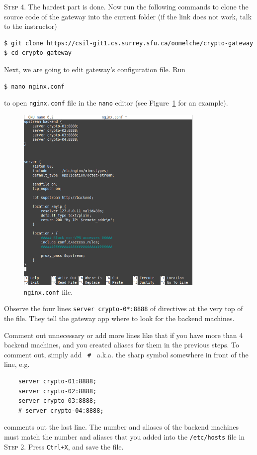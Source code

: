 \documentclass{article}
\begin{document}
\textsc{Step 4}. The hardest part is done. Now run the following commands to clone the source code of the gateway into the current folder (if the link does not work, talk to the instructor)
\begin{lstlisting}[language=bash]
$ git clone https://csil-git1.cs.surrey.sfu.ca/oomelche/crypto-gateway.git
$ cd crypto-gateway
\end{lstlisting}
Next, we are going to edit gateway's configuration file. Run
\begin{lstlisting}
$ nano nginx.conf
\end{lstlisting}
to open \texttt{nginx.conf} file in the \texttt{nano} editor (see Figure~\ref{fig:2} for an example).
\begin{figure}[h!]
    \centering
    \includegraphics[width=0.8\textwidth]{nginx}
    \caption{\texttt{nginx.conf} file.}
        \label{fig:2}
\end{figure}
Observe the four lines \texttt{server crypto-0*:8888} of directives at the very top of the file. They tell the gateway app where to look for the backend machines.

Comment out unnecessary or add more lines like that if you have more than 4 backend machines, and you created aliases for them in the previous steps. To comment out, simply add \ \texttt{\#} \ a.k.a. the sharp symbol somewhere in front of the line, e.g.
\begin{lstlisting}
    server crypto-01:8888;
    server crypto-02:8888;
    server crypto-03:8888;
    # server crypto-04:8888;
\end{lstlisting}
comments out the last line. The number and aliases of the backend machines must match the number and aliases that you added into the \texttt{/etc/hosts} file in \textsc{Step 2}. Press \texttt{Ctrl+X}, and save the file.
\end{document}
